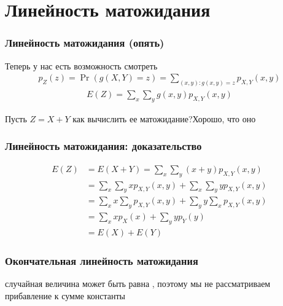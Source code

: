 \documentclass[hyperref=unicode,graphics=pdflatex,13pt,xcolor={usenames,dvipsnames}]{beamer}
\renewcommand\emph[1]{{\color{blue}{#1}}}
\begin{document}
\section{Линейность матожидания}
\begin{frame}
  \frametitle{Линейность матожидания (опять)}
  Теперь у нас есть возможность смотреть \emph{$Z = g(X, Y)$} \smiley
  \pause
  \begin{align*}
    p_Z(z) = \Pr(g(X, Y) = z) = \sum_{(x, y): g(x, y) = z} p_{X, Y}(x, y)
  \end{align*}
  \pause
  \begin{align*}
    E(Z) = \sum_x \sum_y g(x, y) p_{X, Y}(x, y)
  \end{align*}

  \pause
  Пусть $Z = X + Y$ как вычислить ее матожидание?\pause Хорошо, что оно \emph{линейно}

  \begin{center}
  \end{center}
\end{frame}

\begin{frame}
  \frametitle{Линейность матожидания: доказательство}

  \begin{align*}
    E(Z) &= E(X + Y) = \sum_x \sum_y (x + y) p_{X, Y}(x, y) \\
         &= \sum_x \sum_y x  p_{X, Y}(x, y) + \sum_x \sum_y  y p_{X, Y}(x, y) \\
         &= \sum_x x \sum_y p_{X, Y}(x, y) + \sum_y y \sum_x p_{X, Y}(x, y) \\
         &= \sum_x x p_X(x) + \sum_y y p_Y(y) \\
         &= E(X) + E(Y)
  \end{align*}
\end{frame}

\begin{frame}
  \frametitle{Окончательная линейность матожидания}

  \begin{center}
  \end{center}

  \emph{NB:} случайная величина может быть равна \emph{константе}, поэтому мы не рассматриваем прибавление к сумме константы
\end{frame}
\end{document}
